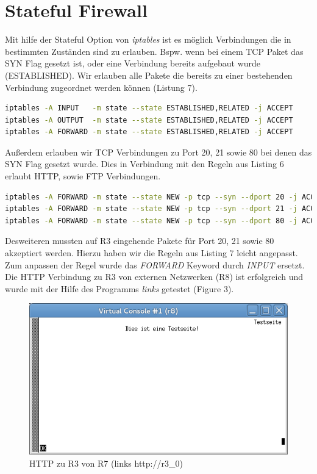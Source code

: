 \documentclass[a4paper,10pt]{article}
\begin{document}
\section{Stateful Firewall}
Mit hilfe der Stateful Option von \textit{iptables} ist es möglich Verbindungen die in bestimmten Zuständen sind zu erlauben. Bspw. wenn
bei einem TCP Paket das SYN Flag gesetzt ist, oder eine Verbindung bereits aufgebaut wurde (ESTABLISHED). Wir erlauben alle Pakete die
bereits zu einer bestehenden Verbindung zugeordnet werden können (Listung 7).
\begin{lstlisting}[language=bash,caption={Stateful ESTABLISHED,RELATED}]
iptables -A INPUT   -m state --state ESTABLISHED,RELATED -j ACCEPT
iptables -A OUTPUT  -m state --state ESTABLISHED,RELATED -j ACCEPT
iptables -A FORWARD -m state --state ESTABLISHED,RELATED -j ACCEPT
\end{lstlisting}
Außerdem erlauben wir TCP Verbindungen zu Port 20, 21 sowie 80 bei denen das SYN Flag gesetzt wurde. Dies in Verbindung mit den Regeln
aus Listing 6 erlaubt HTTP, sowie FTP Verbindungen.
\begin{lstlisting}[language=bash,caption={Stateful NEW, SYN FLAG}]
iptables -A FORWARD -m state --state NEW -p tcp --syn --dport 20 -j ACCEPT
iptables -A FORWARD -m state --state NEW -p tcp --syn --dport 21 -j ACCEPT
iptables -A FORWARD -m state --state NEW -p tcp --syn --dport 80 -j ACCEPT
\end{lstlisting}
Desweiteren mussten auf R3 eingehende Pakete für Port 20, 21 sowie 80 akzeptiert werden. Hierzu haben wir die Regeln aus Listing 7 leicht angepasst.
Zum anpassen der Regel wurde das \textit{FORWARD} Keyword durch \textit{INPUT} ersetzt.\\
\newline
Die HTTP Verbindung zu R3 von externen Netzwerken (R8) ist erfolgreich und wurde mit der Hilfe des Programms \textit{links} getestet (Figure 3).
\begin{figure}[h]
  \centering\includegraphics[scale=.5]{http_r8_to_r3.png}
  \caption{HTTP zu R3 von R7 (links http://r3\_0)}
\end{figure}
\end{document}
